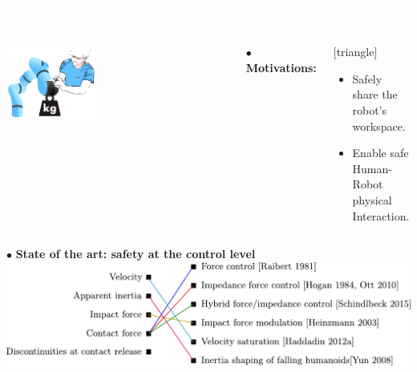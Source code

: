 \begin{frame}[noframenumbering]
  \frametitle{{\textcolor{white}{\hspace{0.3cm}Safety during Human-Robot Interaction -- state of the art}}}
  
 \vspace{-3mm} 
\begin{columns}
\column{.47\paperwidth}
\vspace{-5mm}
\begin{center}
\vspace{2mm}
\includegraphics[width=0.4\textwidth ]{figures/Human_robot_int.png}
\end{center}
 \vspace{-3mm} 
\column{.47\paperwidth}
$\bullet$ \textbf{Motivations:}                     
\begin{center}
[triangle]                        
\begin{itemize}
\item Safely share the robot's workspace.
\item Enable safe Human-Robot physical Interaction.
\end{itemize}                                            
\end{center}
\end{columns}

\vspace{7mm}
\hspace{-4mm}
$\bullet$ \textbf{State of the art: safety at the control level}
\vspace{6mm}
\includegraphics[width=1.0\textwidth]{figures/sttt4.pdf}
\vspace{-1mm}






\end{frame}



